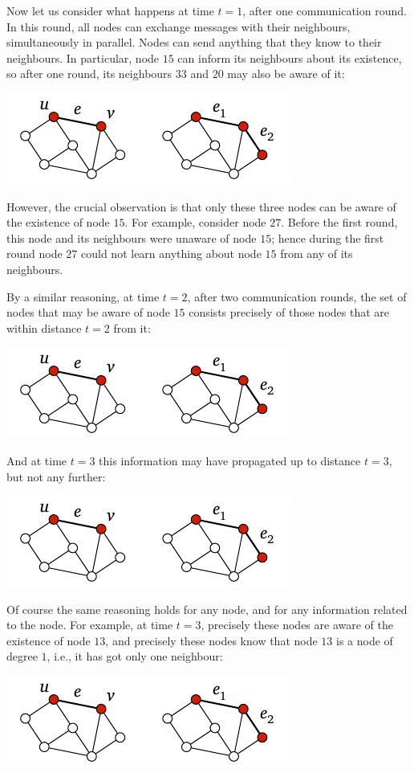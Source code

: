Now let us consider what happens at time {\boldmath $t = 1$}, after one communication round. In this round, all nodes can exchange messages with their neighbours, simultaneously in parallel. Nodes can send anything that they know to their neighbours. In particular, node $15$ can inform its neighbours about its existence, so after one round, its neighbours $33$ and $20$ may also be aware of it:
\begin{center}
    \includegraphics[page=\PIntroTB]{figs.pdf}
\end{center}
However, the crucial observation is that only these three nodes can be aware of the existence of node $15$. For example, consider node $27$. Before the first round, this node and its neighbours were unaware of node $15$; hence during the first round node $27$ could not learn anything about node $15$ from any of its neighbours.

By a similar reasoning, at time {\boldmath $t = 2$}, after two communication rounds, the set of nodes that may be aware of node $15$ consists precisely of those nodes that are within distance $t = 2$ from it:
\begin{center}
    \includegraphics[page=\PIntroTC]{figs.pdf}
\end{center}
And at time {\boldmath $t = 3$} this information may have propagated up to distance $t = 3$, but not any further:
\begin{center}
    \includegraphics[page=\PIntroTD]{figs.pdf}
\end{center}
Of course the same reasoning holds for any node, and for any information related to the node. For example, at time $t = 3$, precisely these nodes are aware of the existence of node $13$, and precisely these nodes know that node $13$ is a node of degree $1$, i.e., it has got only one neighbour:
\begin{center}
    \includegraphics[page=\PIntroTDB]{figs.pdf}
\end{center}


